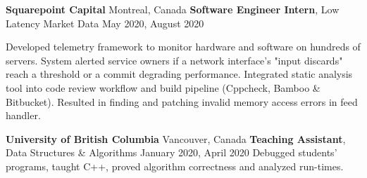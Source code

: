 {    \entrybig
	{
	    \textbf{Squarepoint Capital}
    }
    {
        Montreal, Canada
    }
	{
	    \textbf{Software Engineer Intern}, Low Latency Market Data
    }
    {
        May 2020, August 2020
    }
    
    \innerlist
    {
	    \entry
        {
            Developed telemetry framework to monitor hardware and software on hundreds of servers. System alerted service owners if a network interface's "input discards" reach a threshold or a commit degrading performance.
        }
	    \entry
	    {
            Integrated static analysis tool into code review workflow and build pipeline (Cppcheck, Bamboo \& Bitbucket). Resulted in finding and patching invalid memory access errors in feed handler.
        }
    }

    \entrybig
	{
        \textbf{University of British Columbia}
    }
    {
        Vancouver, Canada
    }
	{
        \textbf{Teaching Assistant}, Data Structures \& Algorithms
    }
    {
        January 2020, April 2020
    }
    \innerlist
    {
        \entry
        {
            Debugged students’ programs, taught C++, proved algorithm correctness and analyzed run-times.
        }
    }
}
